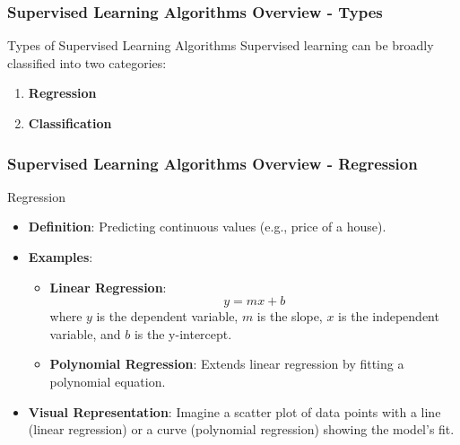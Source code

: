 \documentclass[aspectratio=169]{beamer}
\begin{document}
\begin{frame}[fragile]
    \frametitle{Supervised Learning Algorithms Overview - Types}
    \begin{block}{Types of Supervised Learning Algorithms}
        Supervised learning can be broadly classified into two categories: 
        \begin{enumerate}
            \item \textbf{Regression}
            \item \textbf{Classification}
        \end{enumerate}
    \end{block}
\end{frame}

\begin{frame}[fragile]
    \frametitle{Supervised Learning Algorithms Overview - Regression}
    \begin{block}{Regression}
        \begin{itemize}
            \item \textbf{Definition}: Predicting continuous values (e.g., price of a house).
            \item \textbf{Examples}:
                \begin{itemize}
                    \item \textbf{Linear Regression}:
                        \begin{equation}
                        y = mx + b
                        \end{equation}
                        where \(y\) is the dependent variable, \(m\) is the slope, \(x\) is the independent variable, and \(b\) is the y-intercept.
                    \item \textbf{Polynomial Regression}: Extends linear regression by fitting a polynomial equation.
                \end{itemize}
            \item \textbf{Visual Representation}: 
            Imagine a scatter plot of data points with a line (linear regression) or a curve (polynomial regression) showing the model's fit.
        \end{itemize}
    \end{block}
\end{frame}
\end{document}
